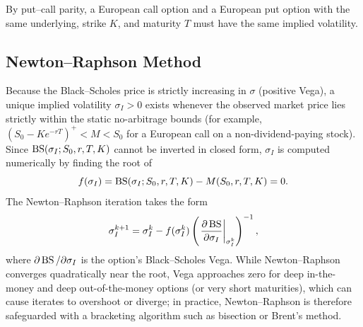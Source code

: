 \begin{note}
    By put--call parity, a European call option and a European put option with the same underlying, strike $K$, and maturity $T$ must have the same implied volatility.
\end{note}

\subsection{Newton--Raphson Method}
Because the Black--Scholes price is strictly increasing in $\sigma$ (positive Vega), a unique implied volatility $\sigma_I > 0$ exists whenever the observed market price lies strictly within the static no-arbitrage bounds (for example, $(S_0 - K e^{-rT})^+ < M < S_0$ for a European call on a non-dividend-paying stock). Since $\operatorname{BS}(\sigma_I; S_0, r, T, K)$ cannot be inverted in closed form, $\sigma_I$ is computed numerically by finding the root of
\[
    f(\sigma_I) = \operatorname{BS}(\sigma_I; S_0, r, T, K) - M(S_0, r, T, K) = 0.
\]
The Newton--Raphson iteration takes the form
\[
    \sigma_I^{k+1} = \sigma_I^k - f(\sigma_I^k)\left(\left.\frac{\partial \operatorname{BS}}{\partial \sigma_I}\right|_{\sigma_I^k}\right)^{-1},
\]
where $\partial \operatorname{BS} / \partial \sigma_I$ is the option's Black--Scholes Vega. While Newton--Raphson converges quadratically near the root, Vega approaches zero for deep in-the-money and deep out-of-the-money options (or very short maturities), which can cause iterates to overshoot or diverge; in practice, Newton--Raphson is therefore safeguarded with a bracketing algorithm such as bisection or Brent's method.

